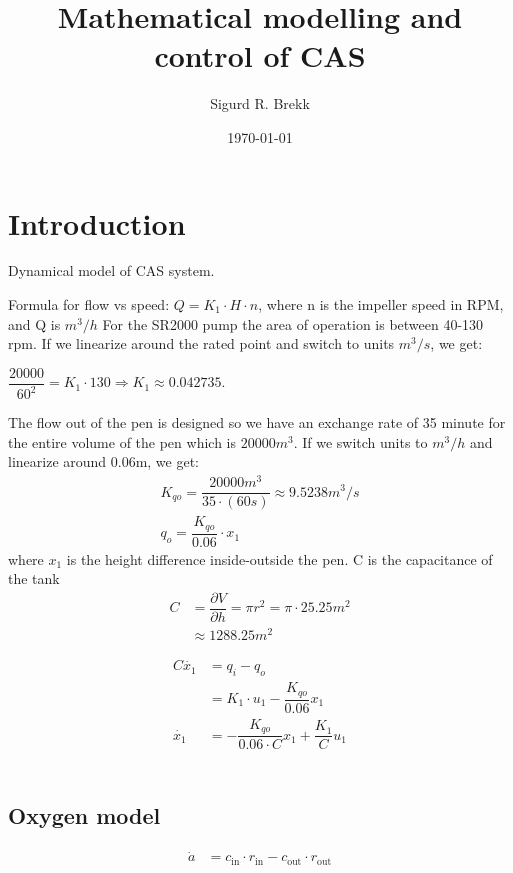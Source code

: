 \documentclass{article}
\begin{document}
\title{Mathematical modelling and control of CAS}
\author{Sigurd R. Brekk}
\date{\today}
\maketitle

\section{Introduction}
Dynamical model of CAS system.

Formula for flow vs speed:
$Q = K_1 \cdot H \cdot n$, where n is the impeller speed in RPM, and Q is $m^3/h$
For the SR2000 pump the area of operation is between 40-130 rpm.
If we linearize around the rated point and switch to units $m^3/s$, we get: \newline

$\dfrac{20000}{60^2} =K_1 \cdot 130 \Longrightarrow K_1 \approx 0.042735$. \newline

The flow out of the pen is designed so we have an exchange rate of 35 minute for the entire volume of the pen which is $20 000m^3$.
If we switch units to $m^3/h$ and linearize around 0.06m, we get: \newline
\begin{align}  
K_{qo} = \dfrac{20 000m^3}{35\cdot (60s)} \approx 9.5238m^3/s\\
q_o = \dfrac{K_{qo}}{0.06} \cdot x_1
\end{align}
where $x_1$ is the height difference inside-outside the pen.
C is the capacitance of the tank \newline
\begin{align}
C&=\dfrac{\partial V}{\partial h} = \pi r^2 = \pi \cdot 25.25m^2\\
&\approx  1288.25m^2
\end{align}

\begin{align}
    C \dot{x_1} &= q_i - q_o\\
    &= K_1 \cdot u_1 - \dfrac{K_{qo}}{0.06}x_1\\
    \dot{x_1}&= -\dfrac{K_{qo}}{0.06\cdot C}x_1 + \dfrac{K_1}{C}u_1 \label{eq:flow}
\end{align}
\
\subsection{Oxygen model}

\begin{align}
    \dot{a} &= c_\text{in}\cdot r_\text{in} - c_\text{out}\cdot r_\text{out}
\end{align}
\end{document}
